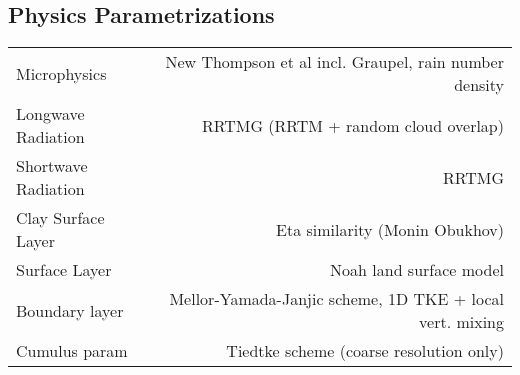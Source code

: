 \subsection{Physics Parametrizations}
\begin{tabular}{lr}
Microphysics       & New Thompson et al incl. Graupel, rain number density\\
Longwave Radiation & RRTMG (RRTM + random cloud overlap)\\
Shortwave Radiation& RRTMG\\
Clay Surface Layer & Eta similarity (Monin Obukhov)\\
Surface Layer      & Noah land surface model\\
Boundary layer     & Mellor-Yamada-Janjic scheme, 1D TKE + local vert. mixing\\
Cumulus param      & Tiedtke scheme (coarse resolution only)\\
\end{tabular}
